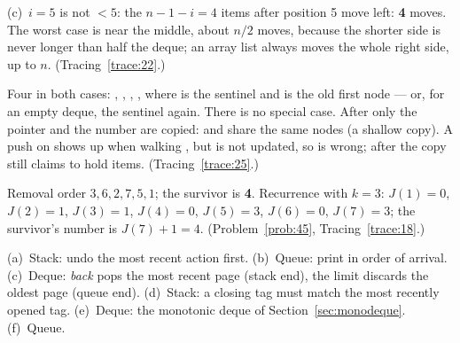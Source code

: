 \begin{questions}
  (c)~$i=5$ is not $<5$: the $n-1-i=4$ items after position 5 move left: \textbf{4}
  moves. The worst case is near the middle, about $n/2$ moves, because the shorter side
  is never longer than half the deque; an array list always moves the whole right side,
  up to $n$. (Tracing~\ref{trace:22}.)
\item Four in both cases: , , , , where
   is the sentinel and  is the old first node --- or, for an empty deque, the
  sentinel again. There is no special case. After  only the pointer
   and the number  are copied:  and  share the same
  nodes (a shallow copy). A push on  shows up when walking , but
   is not updated, so  is wrong; after  the copy
  still claims to hold items. (Tracing~\ref{trace:25}.)
\item Removal order $3,6,2,7,5,1$; the survivor is \textbf{4}. Recurrence with $k=3$:
  $J(1)=0$, $J(2)=1$, $J(3)=1$, $J(4)=0$, $J(5)=3$, $J(6)=0$, $J(7)=3$; the survivor's
  number is $J(7)+1=4$. (Problem~\ref{prob:45}, Tracing~\ref{trace:18}.)
\item (a)~Stack: undo the most recent action first. (b)~Queue: print in order of arrival.
  (c)~Deque: \emph{back} pops the most recent page (stack end), the limit discards the
  oldest page (queue end). (d)~Stack: a closing tag must match the most recently opened
  tag. (e)~Deque: the monotonic deque of Section~\ref{sec:monodeque}. (f)~Queue.
\end{questions}
